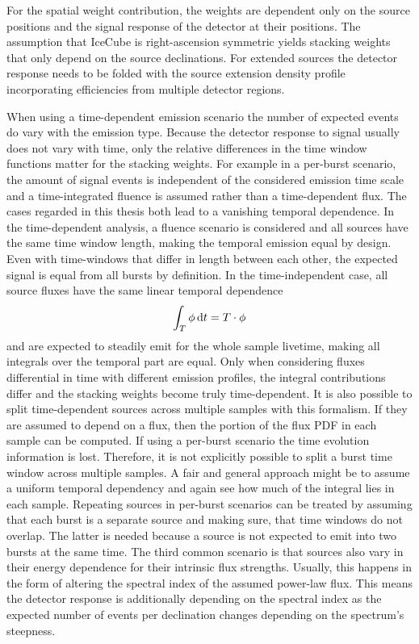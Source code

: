 For the spatial weight contribution, the weights are dependent only on the source positions and the signal response of the detector at their positions.
The assumption that IceCube is right-ascension symmetric yields stacking weights that only depend on the source declinations.
For extended sources the detector response needs to be folded with the source extension density profile incorporating efficiencies from multiple detector regions.

When using a time-dependent emission scenario the number of expected events do vary with the emission type.
Because the detector response to signal usually does not vary with time, only the relative differences in the time window functions matter for the stacking weights.
For example in a per-burst scenario, the amount of signal events is independent of the considered emission time scale and a time-integrated fluence is assumed rather than a time-dependent flux.
The cases regarded in this thesis both lead to a vanishing temporal dependence.
In the time-dependent analysis, a fluence scenario is considered and all sources have the same time window length, making the temporal emission equal by design.
Even with time-windows that differ in length between each other, the expected signal is equal from all bursts by definition.
In the time-independent case, all source fluxes have the same linear temporal dependence
\begin{equation}
  \int_T \phi \,\mathrm{d}t = T\cdot \phi
\end{equation}
and are expected to steadily emit for the whole sample livetime, making all integrals over the temporal part are equal.
Only when considering fluxes differential in time with different emission profiles, the integral contributions differ and the stacking weights become truly time-dependent.
It is also possible to split time-dependent sources across multiple samples with this formalism.
If they are assumed to depend on a flux, then the portion of the flux PDF in each sample can be computed.
If using a per-burst scenario the time evolution information is lost.
Therefore, it is not explicitly possible to split a burst time window across multiple samples.
A fair and general approach might be to assume a uniform temporal dependency and again see how much of the integral lies in each sample.
Repeating sources in per-burst scenarios can be treated by assuming that each burst is a separate source and making sure, that time windows do not overlap.
The latter is needed because a source is not expected to emit into two bursts at the same time.
The third common scenario is that sources also vary in their energy dependence for their intrinsic flux strengths.
Usually, this happens in the form of altering the spectral index of the assumed power-law flux.
This means the detector response is additionally depending on the spectral index as the expected number of events per declination changes depending on the spectrum's steepness.

